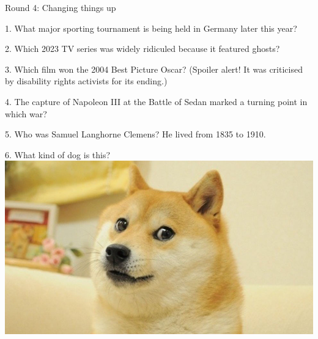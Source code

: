 \begin{frame}
\begin{center}
\Huge
Round 4: Changing things up
\end{center}
\end{frame}
\begin{frame}
\begin{center}
\Large
1. What major sporting tournament is being held in Germany later this year?
\end{center}
\end{frame}
\begin{frame}
\begin{center}
\Large
2. Which 2023 TV series was widely ridiculed because it featured ghosts?
\end{center}
\end{frame}
\begin{frame}
\begin{center}
\Large
3. Which film won the 2004 Best Picture Oscar? (Spoiler alert! It was criticised by disability rights activists for its ending.)
\end{center}
\end{frame}
\begin{frame}
\begin{center}
\Large
4. The capture of Napoleon III at the Battle of Sedan marked a turning point in which war?
\end{center}
\end{frame}
\begin{frame}
\begin{center}
\Large
5. Who was Samuel Langhorne Clemens? He lived from 1835 to 1910.
\end{center}
\end{frame}
\begin{frame}
\begin{center}
\Large
6. What kind of dog is this?
\\
\vspace{0.5em}\includegraphics[height=0.6\paperheight]{images/doge.jpg}
\end{center}
\end{frame}
